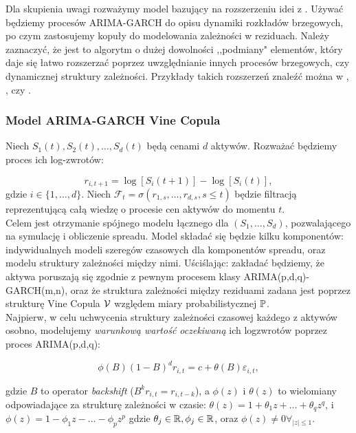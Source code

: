 Dla skupienia uwagi rozważymy model bazujący na rozszerzeniu idei z \cite{Herath_Copula_Crack_Spread}. Używać będziemy procesów ARIMA-GARCH do opisu dynamiki rozkładów brzegowych, po czym zastosujemy kopuły do modelowania zależności w reziduach. Należy zaznaczyć, że jest to algorytm o dużej dowolności ,,podmiany" elementów, który daje się łatwo rozszerzać poprzez uwzględnianie innych procesów brzegowych, czy dynamicznej struktury zależności. Przykłady takich rozszerzeń znaleźć można w \cite{Espen_Crack_Spread_Copula}, \cite{Herath_Copula_Crack_Spread}, \cite{Sukcharoen2017} czy  \cite{Bernard_Pricing_Multivariate_Options_with_copulae}.\\

\subsubsection{Model ARIMA-GARCH Vine Copula}
Niech $S_1(t), S_2(t), \dots, S_d(t)$ będą cenami $d$ aktywów. Rozważać będziemy proces ich log-zwrotów:

\begin{equation}
	r_{i, t+1} = \log[S_i(t+1)] - \log[S_i(t)],
	\label{eq:logreturn}
\end{equation}
gdzie $i\in\{1,\dots, d\}$. Niech $\mathcal{F}_t = \sigma(r_{1,s}, \dots, r_{d,s}, s\leqslant t)$ będzie filtracją reprezentującą całą wiedzę o procesie cen aktywów do momentu $t$.\\

Celem jest otrzymanie spójnego modelu łącznego dla $(S_1, \dots, S_d)$, pozwalającego na symulację i obliczenie spreadu. Model składać się będzie kilku komponentów: indywidualnych modeli szeregów czasowych dla komponentów spreadu, oraz modelu struktury zależności między nimi. Uściślając: zakładać będziemy, że aktywa poruszają się zgodnie z pewnym procesem klasy ARIMA(p,d,q)-GARCH(m,n), oraz że struktura zależności między reziduami zadana jest poprzez strukturę Vine Copula $\mathcal{V}$ względem miary probabilistycznej $\mathbb{P}$.\\

Najpierw, w celu uchwycenia struktury zależności czasowej każdego z aktywów osobno, modelujemy \emph{warunkową wartość oczekiwaną} ich logzwrotów poprzez proces ARIMA(p,d,q):

\begin{equation}
	\phi(B)(1-B)^d r_{i, t} = c + \theta(B)\varepsilon_{i, t},
	\label{eq:arima_part}
\end{equation}

gdzie $B$ to operator \emph{backshift} ($B^kr_{i, t} = r_{i, t-k}$), a $\phi(z)$ i $\theta(z)$ to wielomiany odpowiadające za strukturę zależności w czasie: $\theta(z) = 1 + \theta_1z + \dots + \theta_qz^q$, i $\phi(z) = 1 - \phi_1z - \dots - \phi_pz^p$ gdzie $\theta_j\in\mathbb{R}, \phi_j\in\mathbb{R}$, oraz $\phi(z) \not=0 \forall_{\vert z \vert \leqslant 1}$.

